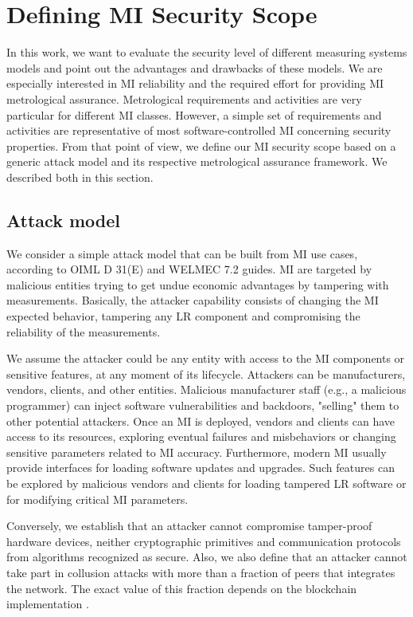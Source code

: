 \documentclass[journal]{IEEEtran}
\begin{document}
\section{Defining MI Security Scope}
In this work, we want to evaluate the security level of different measuring systems models and point out the advantages and drawbacks of these models. 
We are especially interested in MI reliability and the required effort for providing MI metrological assurance.
Metrological requirements and activities are very particular for different MI classes. 
However, a simple set of requirements and activities are representative of most software-controlled MI concerning security properties. 
From that point of view, we define our MI security scope based on a generic attack model and its respective metrological assurance framework. 
We described both in this section.

\subsection{Attack model}
\label{s:attackmodel}
We consider a simple attack model that can be built from MI use cases, according to OIML D 31(E) and WELMEC 7.2 guides. MI are targeted by malicious entities trying to get undue economic advantages by tampering with measurements. 
Basically, the attacker capability consists of changing the MI expected behavior, tampering any LR component and compromising the reliability of the measurements.

We assume the attacker could be any entity with access to the MI components or sensitive features, at any moment of its lifecycle. 
Attackers can be manufacturers, vendors, clients, and other entities. 
Malicious manufacturer staff (e.g., a malicious programmer) can inject software vulnerabilities and backdoors, "selling" them to other potential attackers. 
Once an MI is deployed, vendors and clients can have access to its resources, exploring eventual failures and misbehaviors or changing sensitive parameters related to MI accuracy. 
Furthermore, modern MI usually provide interfaces for loading software updates and upgrades. %
Such features can be explored by malicious vendors and clients for loading tampered LR software or for modifying critical MI parameters.

Conversely, we establish that an attacker cannot compromise tamper-proof hardware devices, neither cryptographic primitives and communication protocols from algorithms recognized as secure. Also, we also define that an attacker cannot take part in collusion attacks with more than a fraction of peers that integrates the network. The exact value of this fraction depends on the blockchain implementation \cite{Vukolic2016}. %
\end{document}

